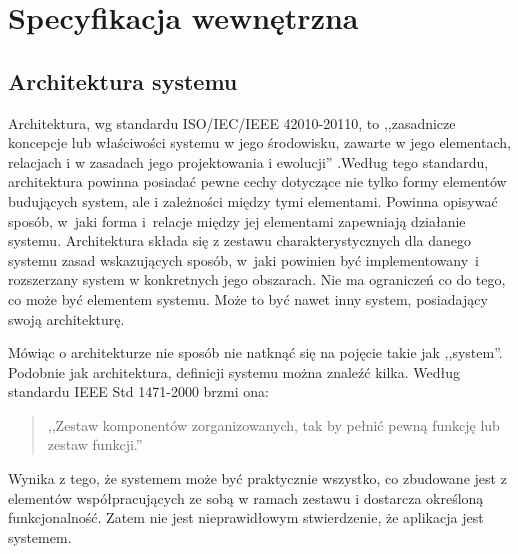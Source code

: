 \documentclass[a4paper]{book}
\begin{document}
{\chapter{Specyfikacja wewnętrzna}



\section{Architektura systemu}


Architektura, wg standardu ISO/IEC/IEEE 42010-20110, to ,,zasadnicze koncepcje lub właściwości systemu w jego środowisku, zawarte w jego elementach, relacjach i w zasadach jego projektowania i ewolucji'' \cite{id:ieee2011_Architecture}.Według tego standardu, architektura powinna posiadać pewne cechy dotyczące nie tylko formy elementów budujących system, ale i zależności między tymi elementami. Powinna opisywać sposób, w~jaki forma i~relacje między jej elementami zapewniają działanie systemu. Architektura składa się z zestawu charakterystycznych dla danego systemu zasad wskazujących sposób, w~jaki powinien być implementowany~i rozszerzany system w konkretnych jego obszarach. Nie ma ograniczeń co do tego, co może być elementem systemu. Może to być nawet inny system, posiadający swoją architekturę.

Mówiąc o architekturze nie sposób nie natknąć się na pojęcie takie jak ,,system''. Podobnie jak architektura, definicji systemu można znaleźć kilka. Według standardu IEEE Std 1471-2000 \cite{id:ieee2000_Architecture} brzmi ona:
\begin{quote}
	,,Zestaw komponentów zorganizowanych, tak by pełnić pewną funkcję lub zestaw funkcji.''
\end{quote}
Wynika z tego, że systemem może być praktycznie wszystko, co zbudowane jest z elementów współpracujących ze sobą w ramach zestawu i dostarcza określoną funkcjonalność. Zatem nie jest nieprawidłowym stwierdzenie, że aplikacja jest systemem.

}
\end{document}
